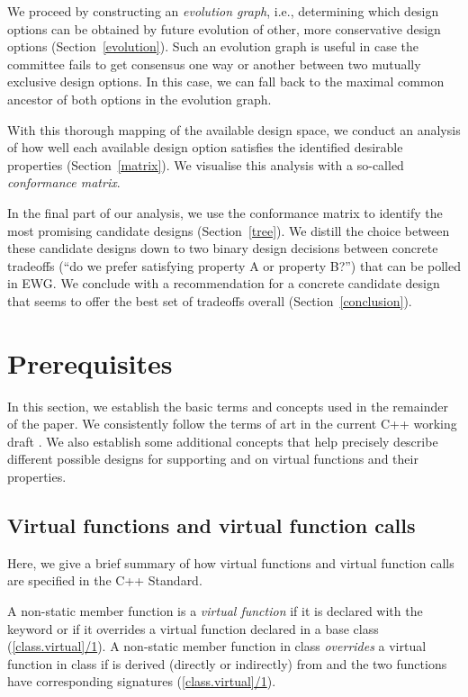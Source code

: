 We proceed by constructing an \emph{evolution graph}, i.e., determining which design options can be obtained by future evolution of other, more conservative design options (Section~\ref{evolution}). Such an evolution graph is useful in case the committee fails to get consensus one way or another between two mutually exclusive design options. In this case, we can fall back to the maximal common ancestor of both options in the evolution graph.

With this thorough mapping of the available design space, we conduct an analysis of how well each available design option satisfies the identified desirable properties (Section~\ref{matrix}). We visualise this analysis with a so-called \emph{conformance matrix}. 

In the final part of our analysis, we use the conformance matrix to identify the most promising candidate designs (Section~\ref{tree}). We distill the choice between these candidate designs down to two binary design decisions between concrete tradeoffs (``do we prefer satisfying property A or property B?'') that can be polled in EWG. We conclude with a recommendation for a concrete candidate design that seems to offer the best set of tradeoffs overall (Section~\ref{conclusion}).

\section{Prerequisites}
\label{prerequisites}


In this section, we establish the basic terms and concepts used in the remainder of the paper. We consistently follow the terms of art in the current C++ working draft \cite{N5014}. We also establish some additional concepts that help precisely describe different possible designs for supporting  and  on virtual functions and their properties.

\subsection{Virtual functions and virtual function calls}

Here, we give a brief summary of how virtual functions and virtual function calls are specified in the C++ Standard.

A non-static member function is a \emph{virtual function} if it is declared with the keyword  or if it overrides a virtual function declared in a base class (\href{https://eel.is/c++draft/class.virtual#1}{[class.virtual]/1}). A non-static member function  in class  \emph{overrides} a virtual function  in class  if  is derived (directly or indirectly) from  and the two functions have corresponding signatures (\href{https://eel.is/c++draft/class.virtual#2.sentence-1}{[class.virtual]/1}).

